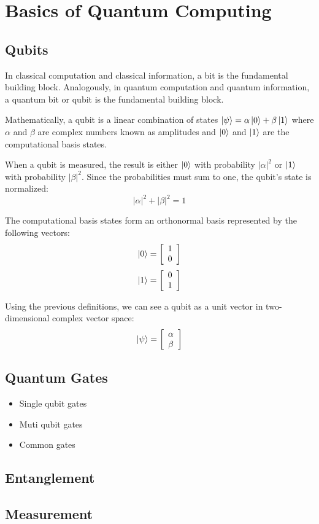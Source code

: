 %
%
\chapter {Basics of Quantum Computing}

\section{Qubits}

In classical computation and classical information, a bit is the fundamental building block.
Analogously, in quantum computation and quantum information, a quantum bit or qubit is the fundamental building block.

Mathematically, a qubit is a linear combination of states $\left|{\psi}\right\rangle=\alpha\left|{0}\right\rangle+\beta\left|{1}\right\rangle$ where $\alpha$ and $\beta$ are complex numbers known as amplitudes and $\left|{0}\right\rangle$ and $\left|{1}\right\rangle$ are the computational basis states.

When a qubit is measured, the result is either $\left|{0}\right\rangle$ with probability $|\alpha|^2$ or $\left|{1}\right\rangle$ with probability $|\beta|^2$.
Since the probabilities must sum to one, the qubit's state is normalized:
$$|\alpha|^2+|\beta|^2=1$$

The computational basis states form an orthonormal basis represented by the following vectors:
$$\left|{0}\right\rangle=\left[\begin{array}{ccc}1 \\ 0\end{array}\right]$$
$$\left|{1}\right\rangle=\left[\begin{array}{ccc}0 \\ 1\end{array}\right]$$

Using the previous definitions, we can see a qubit as a unit vector in two-dimensional complex vector space:
\[\left|{\psi}\right\rangle=\left[\begin{array}{ccc}\alpha \\ \beta\end{array}\right]\]

\section{Quantum Gates}


\begin{itemize}
    \item Single qubit gates
    \item Muti qubit gates
    \item Common gates
\end{itemize}

\section{Entanglement}

\section{Measurement}
